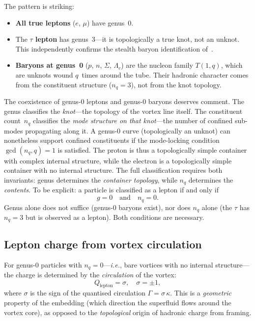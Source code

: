 \documentclass[11pt,a4paper]{article}
\begin{document}
The pattern is striking:
\begin{itemize}
\item \textbf{All true leptons} ($e$, $\mu$) have genus~0.
\item The \textbf{$\tau$ lepton} has genus~3---it is
  topologically a true knot, not an unknot.  This independently
  confirms the stealth baryon identification of~\cite{paper6}.
\item \textbf{Baryons at genus~0} ($p$, $n$, $\Sigma$, $\Lambda_c$)
  are the nucleon family $T(1,q)$, which are unknots wound
  $q$~times around the tube.  Their hadronic character comes
  from the constituent structure ($n_q = 3$), not from the
  knot topology.
\end{itemize}

The coexistence of genus-0 leptons and genus-0 baryons
deserves comment.  The genus classifies the \emph{knot}---the
topology of the vortex line itself.  The constituent count~$n_q$
classifies the \emph{mode structure on that knot}---the number
of confined sub-modes propagating along it.  A genus-0 curve
(topologically an unknot) can nonetheless support confined
constituents if the mode-locking condition $\gcd(n_q, q) = 1$
is satisfied.  The proton is thus a topologically simple
container with complex internal structure, while the electron
is a topologically simple container with no internal structure.
The full classification requires both invariants: genus
determines the \emph{container topology}, while $n_q$ determines
the \emph{contents}.  To be explicit: a particle is classified
as a lepton if and only if
\begin{equation}
  g = 0 \quad\text{and}\quad n_q = 0.
  \label{eq:lepton_criterion}
\end{equation}
Genus alone does not suffice (genus-0 baryons exist), nor does
$n_q$ alone (the $\tau$ has $n_q = 3$ but is observed as a
lepton).  Both conditions are necessary.

\subsection{Lepton charge from vortex circulation}

For genus-0 particles with $n_q = 0$---\textit{i.e.}, bare
vortices with no internal structure---the charge is determined
by the \emph{circulation} of the vortex:
\begin{equation}
  Q_{\text{lepton}} = \sigma, \quad \sigma = \pm 1,
  \label{eq:lepton_charge}
\end{equation}
where $\sigma$ is the sign of the quantised circulation
$\Gamma = \sigma\,\kappa$.  This is a \emph{geometric}
property of the embedding (which direction the superfluid
flows around the vortex core), as opposed to the
\emph{topological} origin of hadronic charge from framing.
\end{document}
